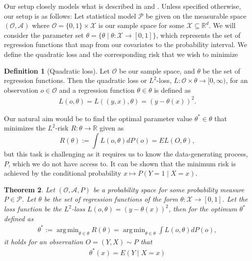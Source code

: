 \documentclass[11pt, a4paper]{article}
\DeclareMathOperator*{\argmin}{arg\,min}
\newtheorem{theorem}{Theorem}
\theoremstyle{definition}
\newtheorem{definition}[theorem]{Definition}
\theoremstyle{remark}
\newcommand{\btheta}{\theta}
\begin{document}
Our setup closely models what is described in \cite{vaart06} and \cite{laan03}. Unless specified otherwise, our setup is as follows:
Let statistical model $ \mathcal{P} $ be given on the measurable space $ (\mathcal{O}, \mathcal{A}) $ where $ \mathcal{O} = \{0,1\} \times \mathcal{X} $ is our sample space for some $ \mathcal{X} \subseteq \mathbb{R}^{d} $. 
We will consider the parameter set $ \btheta = \{\btheta \mid \btheta : \mathcal{X} \to [0,1]\} $, which represents the set of regression functions that map from our covariates to the probability interval. We define the quadratic loss and the corresponding risk that we wish to minimize 
\begin{definition}[Quadratic loss]
    Let $ \mathcal{O}  $ be our sample space, and $ \btheta $ be the set of regression functions. Then the quadratic loss or $ L^2 $-loss, $ L : \mathcal{O} \times \btheta \to [0, \infty) $, for an observation $ o \in \mathcal{O} $ and a regression function $ \btheta \in \btheta $ is defined as 
\begin{align*}
    L(o, \btheta) = L((y,x), \btheta) = (y - \btheta(x))^2.
\end{align*}
\end{definition}
Our natural aim would be to find the optimal parameter value $\btheta^* \in \btheta$ that minimizes the $L^2$-risk $R: \btheta \to \mathbb{R}$ given as 
\begin{equation} \label{l2risk}
    R(\btheta) := \int L(o, \btheta)  dP(o) = EL(O, \btheta),
\end{equation}
but this task is challenging as it requires us to know the data-generating process, $ P $, which we do not have access to. It can be shown that the minimum risk is achieved by the conditional probability $ x \mapsto P(Y = 1\mid X = x) $. 
\begin{theorem}
    Let $ (\mathcal{O} , \mathcal{A}, P) $ be a probability space for some probability measure $ P \in \mathcal{P} $. Let $ \btheta $ be the set of regression functions of the form $ \btheta : \mathcal{X} \to [0,1] $. Let the loss function be the $ L^2 $-loss $ L(o, \btheta) = (y - \btheta(x))^2 $, then for the optimum $ \btheta^* $ defined as 
    \begin{align*}
        \btheta^* := \argmin_{\btheta \in \btheta} R(\btheta)= \argmin_{\btheta \in \btheta} \int L(o, \btheta)  dP(o),
    \end{align*}
    it holds for an observation $ O = (Y, X) \sim P $ that
    \begin{align*}
        \btheta^{*}(x) = E(Y \mid X = x) 
    \end{align*}
\end{theorem}
\end{document}
